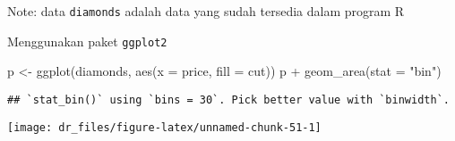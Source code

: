 \documentclass[
]{book}
\newenvironment{Shaded}{\begin{snugshade}}{\end{snugshade}}
\newcommand{\AttributeTok}[1]{\textcolor[rgb]{0.77,0.63,0.00}{#1}}
\newcommand{\FunctionTok}[1]{\textcolor[rgb]{0.00,0.00,0.00}{#1}}
\newcommand{\NormalTok}[1]{#1}
\newcommand{\OtherTok}[1]{\textcolor[rgb]{0.56,0.35,0.01}{#1}}
\newcommand{\SpecialCharTok}[1]{\textcolor[rgb]{0.00,0.00,0.00}{#1}}
\newcommand{\StringTok}[1]{\textcolor[rgb]{0.31,0.60,0.02}{#1}}
\begin{document}
Note: data \texttt{diamonds} adalah data yang sudah tersedia dalam program R

Menggunakan paket \texttt{ggplot2}

\begin{Shaded}
\begin{Highlighting}[]
\NormalTok{p }\OtherTok{\textless{}{-}} \FunctionTok{ggplot}\NormalTok{(diamonds, }\FunctionTok{aes}\NormalTok{(}\AttributeTok{x =}\NormalTok{ price, }\AttributeTok{fill =}\NormalTok{ cut))}
\NormalTok{p }\SpecialCharTok{+} \FunctionTok{geom\_area}\NormalTok{(}\AttributeTok{stat =} \StringTok{"bin"}\NormalTok{)}
\end{Highlighting}
\end{Shaded}

\begin{verbatim}
## `stat_bin()` using `bins = 30`. Pick better value with `binwidth`.
\end{verbatim}

\begin{center}\texttt{[image: dr\_files/figure-latex/unnamed-chunk-51-1]} \end{center}

  
\end{document}

